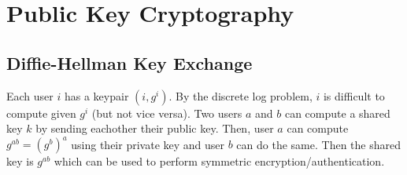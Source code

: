 \documentclass[11pt]{report}
\begin{document}
\section{Public Key Cryptography}

\subsection{Diffie-Hellman Key Exchange}
Each user $i$ has a keypair $(i, g^i)$. By the discrete log problem, $i$ is difficult to compute given $g^i$ (but not vice versa). Two users $a$ and $b$ can compute a shared key $k$ by sending eachother their public key. Then, user $a$ can compute $g^{ab} = (g^b)^a$ using their private key and user $b$ can do the same. Then the shared key is $g^{ab}$ which can be used to perform symmetric encryption/authentication.
\end{document}
